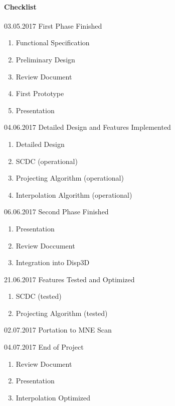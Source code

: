\paragraph{Checklist}
\begin{aims}
	\item[03.05.2017]First Phase Finished
	\begin{enumerate}\itemsep0pt 
		\item Functional Specification
		\item Preliminary Design
		\item Review Document
		\item First Prototype
		\item Presentation
	\end{enumerate}
	
	\item[04.06.2017]Detailed Design and Features Implemented
	\begin{enumerate}\itemsep0pt
		\item Detailed Design
		\item SCDC (operational)
		\item Projecting Algorithm (operational)
		\item Interpolation Algorithm (operational)
	\end{enumerate}
	
	\item[06.06.2017]Second Phase Finished
	\begin{enumerate}\itemsep0pt
		\item Presentation
		\item Review Doccument
		\item Integration into Disp3D
	\end{enumerate}

	\item[21.06.2017]Features Tested and Optimized
	\begin{enumerate}\itemsep0pt
		\item SCDC (tested)
		\item Projecting Algorithm (tested)
	\end{enumerate}
	
	\item[02.07.2017]Portation to MNE Scan
	
	\item[04.07.2017]End of Project
	\begin{enumerate}\itemsep0pt
		\item Review Document
		\item Presentation
		\item Interpolation Optimized
	\end{enumerate}


\end{aims}

